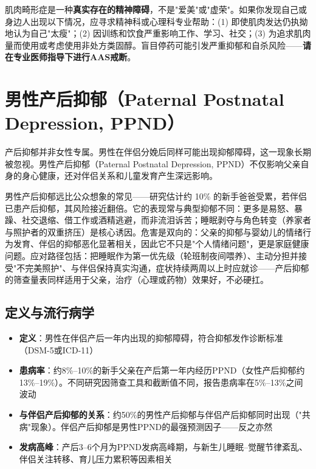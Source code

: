 \begin{tcolorbox}[colback=pink!5!white,colframe=red!50!black,title=贴心小叮咛]
肌肉畸形症是一种\textbf{真实存在的精神障碍}，不是"爱美"或"虚荣"。如果你发现自己或身边人出现以下情况，应寻求精神科或心理科专业帮助：(1) 即使肌肉发达仍执拗地认为自己"太瘦"；(2) 因训练和饮食严重影响工作、学习、社交；(3) 为追求肌肉量而使用或考虑使用非处方类固醇。盲目停药可能引发严重抑郁和自杀风险——\textbf{请在专业医师指导下进行AAS戒断}。
\end{tcolorbox}

\section{男性产后抑郁（Paternal Postnatal Depression, PPND）}

产后抑郁并非女性专属。男性在伴侣分娩后同样可能出现抑郁障碍，这一现象长期被忽视。男性产后抑郁（Paternal Postnatal Depression, PPND）不仅影响父亲自身的身心健康，还对伴侣关系和儿童发育产生深远影响。


男性产后抑郁远比公众想象的常见——研究估计约 10\% 的新手爸爸受累，若伴侣已患产后抑郁，其风险接近翻倍。它的表现常与典型抑郁不同：更多是易怒、暴躁、社交退缩、借工作或酒精逃避，而非流泪诉苦；睡眠剥夺与角色转变（养家者与照护者的双重挤压）是核心诱因。危害是双向的：父亲的抑郁与婴幼儿的情绪行为发育、伴侣的抑郁恶化显著相关，因此它不只是"个人情绪问题"，更是家庭健康问题。应对路径包括：把睡眠作为第一优先级（轮班制夜间喂养）、主动分担并接受"不完美照护"、与伴侣保持真实沟通，症状持续两周以上时应就诊——产后抑郁的筛查量表同样适用于父亲，治疗（心理或药物）效果好，不必硬扛。

\subsection{定义与流行病学}

\begin{itemize}[leftmargin=2cm]
	\item \textbf{定义}：男性在伴侣产后一年内出现的抑郁障碍，符合抑郁发作诊断标准（DSM-5或ICD-11）
	\item \textbf{患病率}：约8\%--10\%的新手父亲在产后第一年内经历PPND（女性产后抑郁约13\%--19\%）。不同研究因筛查工具和截断值不同，报告患病率在5\%--13\%之间波动
	\item \textbf{与伴侣产后抑郁的关系}：约50\%的男性产后抑郁与伴侣产后抑郁同时出现（"共病"现象）。伴侣产后抑郁是男性PPND的最强预测因子——反之亦然
	\item \textbf{发病高峰}：产后3--6个月为PPND发病高峰期，与新生儿睡眠--觉醒节律紊乱、伴侣关注转移、育儿压力累积等因素相关
\end{itemize}

